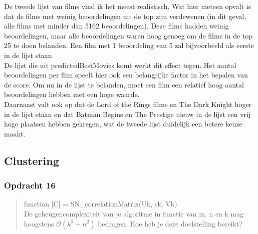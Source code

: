\documentclass[11pt, a4paper, titlepage, openright]{article}
\begin{document}
    De tweede lijst van films vind ik het meest realistisch. Wat hier meteen opvalt is dat de films met weinig beoordelingen
    uit de top zijn verdewenen (in dit geval, alle films met minder dan 5162 beoordelingen). Deze films hadden weinig beoordelingen,
    maar alle beoordelingen waren hoog genoeg om de films in de top 25 te doen belanden. Een film met 1 beoordeling van 5 zal bijvoorbeeld
    als eerste in de lijst staan. \\
    De lijst die uit predictedBestMovies komt werkt dit effect tegen. Het aantal beoordelingen per flim speelt hier ook een
    belangrijke factor in het bepalen van de score. Om nu in de lijst te belanden, moet een film een relatief hoog aantal beoordelingen hebben
    met een hoge waarde. \\

    Daarnaast valt ook op dat de Lord of the Rings films en The Dark Knight hoger in de lijst staan en dat Batman Begins en The Prestige
    nieuw in de lijst een vrij hoge plaatsen hebben gekregen, wat de tweede lijst duidelijk een betere keuze maakt.
	\subsection{Clustering}

	\subsubsection{Opdracht 16}
    \begin{quote}
        function [C] = SN\_correlationMatrix(Uk, sk, Vk) \\
        De geheugencomplexiteit van je algoritme in functie van m, n en k mag hoogstens \(\mathcal{O}(k^2 + n^2)\) bedragen.
        Hoe heb je deze doelstelling bereikt?
    \end{quote}
\end{document}
